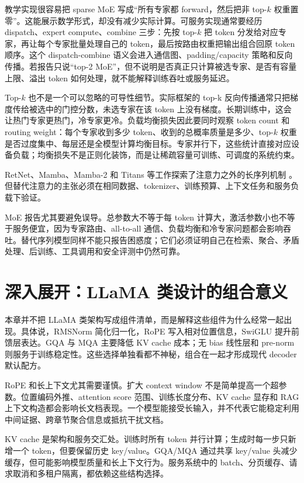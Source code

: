 \documentclass[UTF8,zihao=-4,openany]{ctexbook}
\begin{document}
教学实现很容易把 sparse MoE 写成“所有专家都 forward，然后把非 top-$k$ 权重置零”。这能展示数学形式，却没有减少实际计算。可服务实现通常要经历 dispatch、expert compute、combine 三步：先按 top-$k$ 把 token 分发给对应专家，再让每个专家批量处理自己的 token，最后按路由权重把输出组合回原 token 顺序。这个 dispatch-combine 语义会进入通信图、padding/capacity 策略和反向传播。若报告只说“top-2 MoE”，但不说明是否真正只计算被选专家、是否有容量上限、溢出 token 如何处理，就不能解释训练吞吐或服务延迟。

Top-$k$ 也不是一个可以忽略的可导性细节。实际框架的 top-k 反向传播通常只把梯度传给被选中的门控分数，未选专家在该 token 上没有梯度。长期训练中，这会让热门专家更热门，冷专家更冷。负载均衡损失因此要同时观察 token count 和 routing weight：每个专家收到多少 token、收到的总概率质量是多少、top-$k$ 权重是否过度集中、每层还是全模型计算均衡目标。专家并行下，这些统计直接对应设备负载；均衡损失不是正则化装饰，而是让稀疏容量可训练、可调度的系统约束。

RetNet、Mamba、Mamba-2 和 Titans 等工作探索了注意力之外的长序列机制 \cite{sun2023retnet,gu2023mamba,dao2024mamba2,behrouz2025titans}。但替代注意力的主张必须在相同数据、tokenizer、训练预算、上下文任务和服务负载下验证。

MoE 报告尤其要避免误导。总参数大不等于每 token 计算大，激活参数小也不等于服务便宜，因为专家路由、all-to-all 通信、负载均衡和冷专家问题都会影响吞吐。替代序列模型同样不能只报告困惑度；它们必须证明自己在检索、聚合、矛盾处理、后训练、工具调用和安全评测中仍然可靠。

\section{深入展开：LLaMA 类设计的组合意义}
本章并不把 LLaMA 类架构写成组件清单，而是解释这些组件为什么经常一起出现。具体说，RMSNorm 简化归一化，RoPE 写入相对位置信息，SwiGLU 提升前馈层表达。GQA 与 MQA 主要降低 KV cache 成本；无 bias 线性层和 pre-norm 则服务于训练稳定性。这些选择单独看都不神秘，组合在一起才形成现代 decoder 默认配方。

RoPE 和长上下文尤其需要谨慎。扩大 context window 不是简单提高一个超参数。位置编码外推、attention score 范围、训练长度分布、KV cache 显存和 RAG 上下文构造都会影响长文档表现。一个模型能接受长输入，并不代表它能稳定利用中间证据、跨章节聚合信息或抵抗干扰文档。

KV cache 是架构和服务交汇处。训练时所有 token 并行计算；生成时每一步只新增一个 token，但要保留历史 key/value。GQA/MQA 通过共享 key/value 头减少缓存，但可能影响模型质量和长上下文行为。服务系统中的 batch、分页缓存、请求取消和多租户隔离，都依赖这些结构选择。
\end{document}
